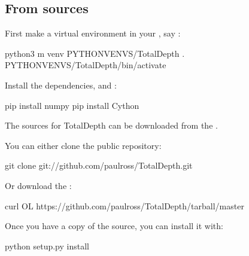 \documentclass[letterpaper,10pt,english]{sphinxmanual}
\begin{document}
\subsection{From sources}
\label{\detokenize{installation:python-installation-guide}}\label{\detokenize{installation:from-sources}}
First make a virtual environment in your , say :

\begin{sphinxVerbatim}[commandchars=\\\{\}]
 python3 \PYGZhy{}m venv \PYGZlt{}PYTHONVENVS\PYGZgt{}/TotalDepth
 . \PYGZlt{}PYTHONVENVS\PYGZgt{}/TotalDepth/bin/activate
\end{sphinxVerbatim}

Install the dependencies,  and :

\begin{sphinxVerbatim}[commandchars=\\\{\}]
 pip install numpy
 pip install Cython
\end{sphinxVerbatim}

The sources for TotalDepth can be downloaded from the .

You can either clone the public repository:

\begin{sphinxVerbatim}[commandchars=\\\{\}]
 git clone git://github.com/paulross/TotalDepth.git
\end{sphinxVerbatim}

Or download the :

\begin{sphinxVerbatim}[commandchars=\\\{\}]
 curl  \PYGZhy{}OL https://github.com/paulross/TotalDepth/tarball/master
\end{sphinxVerbatim}

Once you have a copy of the source, you can install it with:

\begin{sphinxVerbatim}[commandchars=\\\{\}]
 python setup.py install
\end{sphinxVerbatim}
\end{document}
